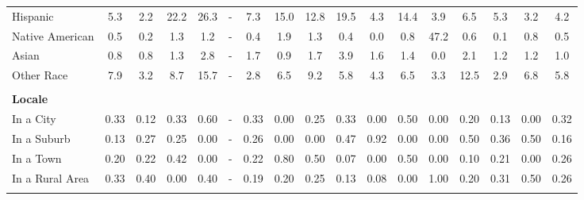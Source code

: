 \begin{tabular*}{\linewidth}{@{\extracolsep{\fill} } lcccccccccccccccc}
\hspace{0.2cm}Hispanic&5.3&2.2&22.2&26.3&{-}&7.3&15.0&12.8&19.5&4.3&14.4&3.9&6.5&5.3&3.2&4.2\\%
\hspace{0.2cm}Native American&0.5&0.2&1.3&1.2&{-}&0.4&1.9&1.3&0.4&0.0&0.8&47.2&0.6&0.1&0.8&0.5\\%
\hspace{0.2cm}Asian&0.8&0.8&1.3&2.8&{-}&1.7&0.9&1.7&3.9&1.6&1.4&0.0&2.1&1.2&1.2&1.0\\%
\hspace{0.2cm}Other Race&7.9&3.2&8.7&15.7&{-}&2.8&6.5&9.2&5.8&4.3&6.5&3.3&12.5&2.9&6.8&5.8\\%
&&&&&&&&&&&&&&&&\\%
\multicolumn{17}{l}{\bfseries Locale}\\%
\hspace{0.2cm}In a City&0.33&0.12&0.33&0.60&{-}&0.33&0.00&0.25&0.33&0.00&0.50&0.00&0.20&0.13&0.00&0.32\\%
\hspace{0.2cm}In a Suburb&0.13&0.27&0.25&0.00&{-}&0.26&0.00&0.00&0.47&0.92&0.00&0.00&0.50&0.36&0.50&0.16\\%
\hspace{0.2cm}In a Town&0.20&0.22&0.42&0.00&{-}&0.22&0.80&0.50&0.07&0.00&0.50&0.00&0.10&0.21&0.00&0.26\\%
\hspace{0.2cm}In a Rural Area&0.33&0.40&0.00&0.40&{-}&0.19&0.20&0.25&0.13&0.08&0.00&1.00&0.20&0.31&0.50&0.26\\%
&&&&&&&&&&&&&&&&\\%
\hline%
\end{tabular*}